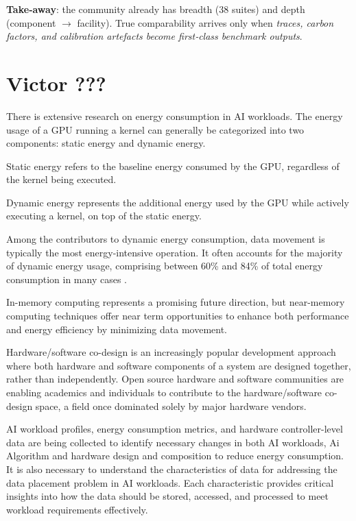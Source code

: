 \textbf{Take‑away}: the community already has breadth (38 suites) and depth
(component $\rightarrow$ facility).  True comparability arrives only when
\emph{traces, carbon factors, and calibration artefacts become first‑class
benchmark outputs}.


\section{Victor ???}

There is extensive research on energy consumption in AI workloads. The energy usage of a GPU running a kernel can generally be categorized into two components: static energy and dynamic energy.

Static energy refers to the baseline energy consumed by the GPU, regardless of the kernel being executed.

Dynamic energy represents the additional energy used by the GPU while actively executing a kernel, on top of the static energy.

Among the contributors to dynamic energy consumption, data movement is typically the most energy-intensive operation. It often accounts for the majority of dynamic energy usage, comprising between 60\% and 84\% of total energy consumption in many cases \cite{delestrac2024analyzing}.

In-memory computing represents a promising future direction, but near-memory computing techniques offer near term opportunities to enhance both performance and energy efficiency by minimizing data movement.

Hardware/software co-design is an increasingly popular development approach where both hardware and software components of a system are designed together, rather than independently. Open source hardware and software communities are enabling academics and individuals to contribute to the hardware/software co-design space, a field once dominated solely by major hardware vendors.

AI workload profiles, energy consumption metrics, and hardware controller-level data are being collected to identify necessary changes in both AI workloads, Ai Algorithm and hardware design and composition to reduce energy consumption.    It is also necessary to understand the characteristics of data for addressing the data placement problem in AI workloads. Each characteristic provides critical insights into how the data should be stored, accessed, and processed to meet workload requirements effectively. 

